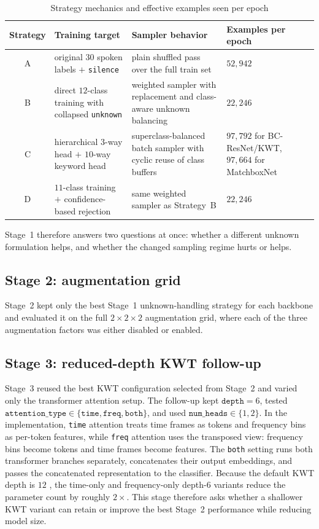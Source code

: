 \documentclass[11pt]{article}
\begin{document}
\begin{table}[t!]
\centering
\caption{Strategy mechanics and effective examples seen per epoch}
\label{tab:strategy-mechanics}
\smallskip
\small
\begin{tabularx}{\textwidth}{@{}c >{\raggedright\arraybackslash}X >{\raggedright\arraybackslash}X >{\centering\arraybackslash}p{2.4cm}@{}}
\toprule
\textbf{Strategy} & \textbf{Training target} & \textbf{Sampler behavior} & \textbf{Examples per epoch}\\
\midrule
A & original \(30\) spoken labels \(+\) \texttt{silence} & plain shuffled pass over the full train set & \(52{,}942\) \\
\midrule
B & direct \(12\)-class training with collapsed \texttt{unknown} & weighted sampler with replacement and class-aware unknown balancing & \(22{,}246\) \\
\midrule
C & hierarchical \(3\)-way head \(+\) \(10\)-way keyword head & superclass-balanced batch sampler with cyclic reuse of class buffers & \(97{,}792\) for BC-ResNet/KWT, \(97{,}664\) for MatchboxNet \\
\midrule
D & \(11\)-class training \(+\) confidence-based rejection & same weighted sampler as Strategy~B & \(22{,}246\) \\
\bottomrule
\end{tabularx}
\end{table}

Stage~1 therefore answers two questions at once: whether a different unknown formulation helps, and whether the changed sampling regime hurts or helps.

\subsection*{Stage 2: augmentation grid}
Stage~2 kept only the best Stage~1 unknown-handling strategy for each backbone and evaluated it on the full \(2\times2\times2\) augmentation grid, where each of the three augmentation factors was either disabled or enabled.




\subsection*{Stage 3: reduced-depth KWT follow-up}
Stage~3 reused the best KWT configuration selected from Stage~2 and varied only the transformer attention setup. The follow-up kept \(\texttt{depth}=6\), tested \(\texttt{attention\_type}\in\{\texttt{time}, \texttt{freq}, \texttt{both}\}\), and used \(\texttt{num\_heads}\in\{1,2\}\). In the implementation, \texttt{time} attention treats time frames as tokens and frequency bins as per-token features, while \texttt{freq} attention uses the transposed view: frequency bins become tokens and time frames become features. The \texttt{both} setting runs both transformer branches separately, concatenates their output embeddings, and passes the concatenated representation to the classifier. Because the default KWT depth is \(12\) \cite{kwt}, the time-only and frequency-only depth-\(6\) variants reduce the parameter count by roughly \(2\times\). This stage therefore asks whether a shallower KWT variant can retain or improve the best Stage~2 performance while reducing model size.
\end{document}
